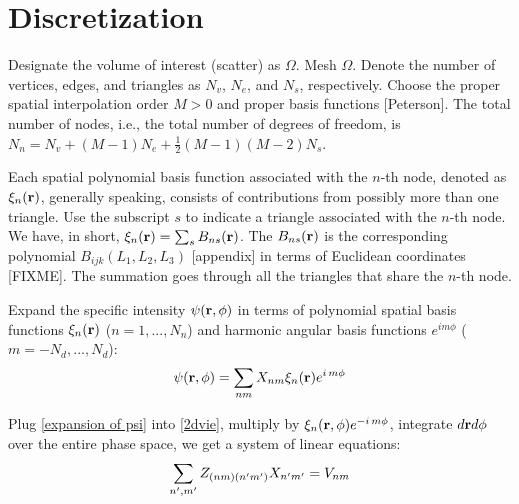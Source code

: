 \documentclass[main]{subfiles}
\begin{document}
\section{Discretization}
\label{sec:discretization}
Designate the volume of interest (scatter) as $\Omega$. Mesh $\Omega$. Denote 
the number of vertices, edges, and triangles as $N_v$, $N_e$, and $N_s$, 
respectively. Choose the proper spatial interpolation order $M>0$ and proper 
basis functions [Peterson]. The total number of nodes, i.e., the total number 
of degrees of freedom, is $N_n=N_v+(M-1)N_e+\frac{1}{2}(M-1)(M-2)N_s$.

Each spatial polynomial basis function associated with the $n$-th node, denoted
as $\xi_n(\mathbf{r})$, generally speaking, consists of contributions from possibly
more than one triangle. Use the subscript $s$ to indicate a triangle associated 
with the $n$-th node. We have, in short, $\xi_n(\mathbf{r})=\sum\nolimits_s
B_{ns}(\mathbf{r})$. The $B_{ns}(\mathbf{r})$ is the corresponding polynomial 
$B_{ijk}(L_1,L_2,L_3)$ [appendix] in terms of Euclidean coordinates [FIXME]. The
summation goes through all the triangles that share the $n$-th node.

Expand the specific intensity $\psi(\mathbf{r},\phi)$ in terms of polynomial spatial 
basis functions $\xi_n(\mathbf{r})$ ($n=1,...,N_n$) and harmonic angular basis 
functions $e^{i m \phi}$ ($m=-N_d,...,N_d$):
\begin{equation} \label{expansion of psi}
	\psi(\mathbf{r},\phi)=\sum\limits_{nm}
	X_{nm}\xi_n(\mathbf{r})e^{i\,m\phi}
\end{equation}

Plug \eqref{expansion of psi} into \eqref{2dvie}, multiply by
$\xi_n(\mathbf{r},\phi)e^{-i\,m \phi}$, integrate $d\mathbf{r}d\phi$ over the entire phase
space, we get a system of linear equations:
\begin{equation*}
	\sum\limits_{n^{\prime},m^{\prime}}Z_{(nm)(n^{\prime} m^{\prime})}X_{n^{\prime} m^{\prime}}=V_{nm}
\end{equation*}
\end{document}
